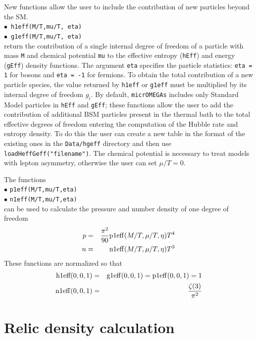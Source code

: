 \documentclass[12pt,a4paper]{article}
\begin{document}
New functions allow the user to include the contribution of new particles beyond the SM. \\
\noindent$\bullet$~\verb|h1eff(M/T,mu/T, eta)| \\
\noindent$\bullet$~\verb|g1eff(M/T,mu/T, eta)| \\
return the contribution of a single internal degree of freedom of a particle with mass \texttt{M} and chemical potential \texttt{mu}
to the effective entropy (\texttt{hEff}) and energy (\texttt{gEff}) density functions.  
The argument \texttt{eta} specifies the particle statistics: \texttt{eta = 1} for bosons and \texttt{eta = -1} for fermions.  
To obtain the total contribution of a new particle species, the value returned by \verb|h1eff| or \verb|g1eff| must be multiplied by its internal 
degree of freedom $g_i$. By default, \texttt{micrOMEGAs} includes only Standard Model particles in 
\texttt{hEff} and \texttt{gEff}; these functions allow the user to add the contribution of additional 
BSM particles present in the thermal bath to the total effective degrees of freedom entering the computation 
of the Hubble rate and entropy density. To do this the user can create a new table in the format of the existing ones in the \verb|Data/hgeff| directory and then use \verb|loadHeffGeff("filename")|. The chemical potential is necessary  to treat models with lepton asymmetry, otherwise the user can set $\mu/T=0$.
 
The functions \\
\noindent$\bullet$ \verb|p1eff(M/T,mu/T,eta)|\\
\noindent$\bullet$ \verb|n1eff(M/T,mu/T,eta)|\\
can be used to calculate the  pressure and number density of one degree of freedom
\begin{eqnarray}
p&=& \frac{\pi^2}{90}  {\rm p1eff}(M/T,\mu/T,\eta)T^4\\
n&=&  {\rm n1eff}(M/T,\mu/T,\eta)T^3
\end{eqnarray}
These functions are normalized so that 
\begin{eqnarray}
 {\rm h1eff(0,0,1)}&=&{\rm g1eff}(0,0,1)={\rm p1eff}(0,0,1)=1\\
{\rm  n1eff}(0,0,1)&=&\frac{\zeta(3)}{\pi^2}
\end{eqnarray}  



\section{Relic density calculation}
\end{document}
